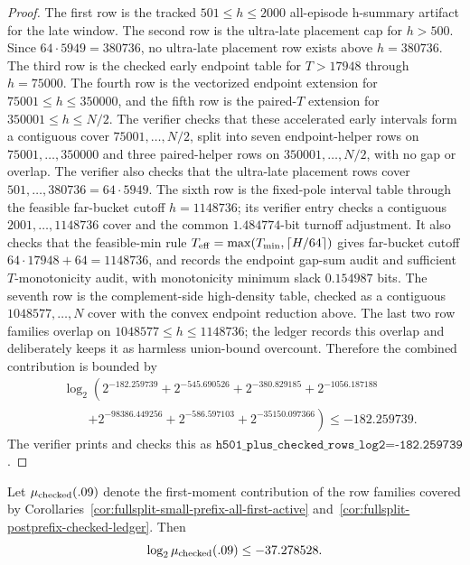 \begin{proof}
The first row is the tracked \(501\le h\le2000\) all-episode h-summary artifact for the late window.  The second row is
the ultra-late placement cap for \(h>500\).  Since \(64\cdot5949=380736\), no ultra-late placement row exists above
\(h=380736\).  The third row is the checked early endpoint table for \(T>17948\) through \(h=75000\).  The fourth row is
the vectorized endpoint extension for \(75001\le h\le350000\), and the fifth row is the paired-\(T\) extension for
\(350001\le h\le N/2\).  The verifier checks that these accelerated early intervals form a contiguous cover
\(75001,\ldots,N/2\), split into seven endpoint-helper rows on \(75001,\ldots,350000\) and three paired-helper rows on
\(350001,\ldots,N/2\), with no gap or overlap.  The verifier also checks that the ultra-late placement rows cover
\(501,\ldots,380736=64\cdot5949\).  The sixth row is the fixed-pole interval table through the feasible far-bucket
cutoff \(h=1148736\); its verifier entry checks a contiguous \(2001,\ldots,1148736\) cover and the common
\(1.484774\)-bit turnoff adjustment.  It also checks that the feasible-min rule
\(T_{\rm eff}=\max(T_{\min},\lceil H/64\rceil)\) gives far-bucket cutoff \(64\cdot17948+64=1148736\), and records the
endpoint gap-sum audit and sufficient \(T\)-monotonicity audit, with monotonicity minimum slack \(0.154987\) bits.  The
seventh row is the complement-side high-density table, checked as a contiguous \(1048577,\ldots,N\) cover with the
convex endpoint reduction above.  The last two row families overlap on \(1048577\le h\le1148736\); the ledger records
this overlap and deliberately keeps it as harmless union-bound overcount.  Therefore the combined contribution is
bounded by
\[
\begin{aligned}
&\log_2\!\left(2^{-182.259739}+2^{-545.690526}+2^{-380.829185}+2^{-1056.187188}\right.\\
&\qquad\left.+2^{-98386.449256}+2^{-586.597103}+2^{-35150.097366}\right)\le -182.259739.
\end{aligned}
\]
The verifier prints and checks this as
\(\texttt{h501\_plus\_checked\_rows\_log2=-182.259739}\).
\end{proof}

\begin{corollary}
\label{cor:fullsplit-current-finite-checkpoint}
Let \(\mu_{\rm checked}(.09)\) denote the first-moment contribution of the row families covered by
Corollaries~\ref{cor:fullsplit-small-prefix-all-first-active} and~\ref{cor:fullsplit-postprefix-checked-ledger}.
Then
\[
\log_2 \mu_{\rm checked}(.09)\le -37.278528.
\]
\end{corollary}

